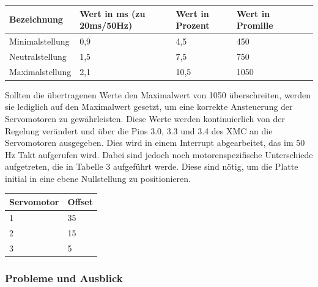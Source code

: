 \documentclass[12pt,a4paper,bibliography=totoc,listof=totoc]{scrartcl}
\begin{document}
\begin{tabularx}{\textwidth}{p{}|X|X|X|X|X|}
\hline
 Bezeichnung 		& Wert in ms (zu 20ms/50Hz) & Wert in Prozent 	& Wert in Promille \\
\hline
 Minimalstellung		& 0,9						& 4,5				& 450 \\
\hline
 Neutralstellung		& 1,5						& 7,5				& 750 \\
\hline
 Maximalstellung		&2,1						& 10,5				& 1050\\
\hline
\end{tabularx}
\newline
Sollten die übertragenen Werte den Maximalwert von 1050 überschreiten, werden sie lediglich auf den 
Maximalwert gesetzt, um eine korrekte Ansteuerung der Servomotoren zu gewährleisten. Diese Werte werden 
kontinuierlich von der Regelung verändert und über die Pins 3.0, 3.3 und 3.4 des XMC an die Servomotoren 
ausgegeben. Dies wird in einem Interrupt abgearbeitet, das im 50 Hz Takt aufgerufen wird. Dabei sind jedoch 
noch motorenspezifische Unterschiede aufgetreten, die in Tabelle 3 aufgeführt werde. Diese sind nötig, um 
die Platte initial in eine ebene Nullstellung zu positionieren.

\begin{tabularx}{4cm}{|l|l|}
\hline
 Servomotor		& Offset \\
\hline
 1				& 35	\\
\hline
 2				& 15\\
\hline
 3				& 5	\\
\hline
\end{tabularx}
\newline
\subsubsection{Probleme und Ausblick}
\end{document}
